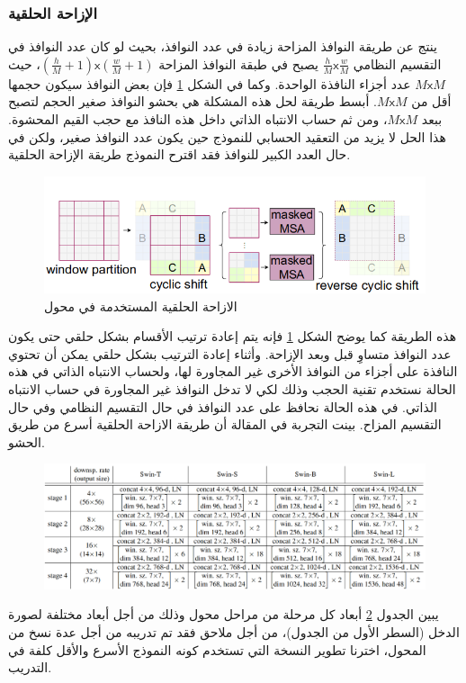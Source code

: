 \subsubsection{الإزاحة الحلقية
}
ينتج عن طريقة النوافذ المزاحة زيادة في عدد النوافذ، بحيث لو كان عدد النوافذ في التقسيم النظامي
$\frac{h}{M} \mathsf{x} \frac{w}{M}$
يصبح في طبقة النوافذ المزاحة
$(\frac{h}{M} +1) \mathsf{x} (\frac{w}{M}+1)$،
حيث
$M \mathsf{x} M$
عدد أجزاء النافذة الواحدة. وكما في الشكل 
\ref{fig:swin_shifted_cycled_window}
 فإن بعض النوافذ سيكون حجمها أقل من 
$M\mathsf{x}M$.
أبسط طريقة لحل هذه المشكلة هي بحشو 
النوافذ صغير الحجم لتصبح ببعد 
$M\mathsf{x}M$،
ومن ثم حساب الانتباه الذاتي داخل هذه النافذ  مع حجب القيم المحشوة.
هذا الحل لا يزيد من التعقيد الحسابي للنموذج حين يكون عدد النوافذ صغير، ولكن في حال العدد الكبير للنوافذ فقد اقترح النموذج طريقة الإزاحة الحلقية. 
\begin{figure}[!h]
	\centerline{\includegraphics[width=\textwidth]{images/swin_shifted_cycled_window.png}}
	\caption{
		الازاحة الحلقية المستخدمة في محول
		}
	\label{fig:swin_shifted_cycled_window}
\end{figure}
هذه الطريقة كما يوضح الشكل 
\ref{fig:swin_shifted_cycled_window}
 فإنه يتم إعادة ترتيب الأقسام بشكل حلقي حتى يكون عدد النوافذ متساوِ قبل وبعد الإزاحة. وأثناء إعادة الترتيب بشكل حلقي يمكن أن تحتوي النافذة على أجزاء من النوافذ الأخرى غير المجاورة لها،  ولحساب الانتباه الذاتي في هذه الحالة نستخدم تقنية الحجب 
 وذلك لكي لا تدخل النوافذ غير المجاورة في حساب الانتباه الذاتي.
في هذه الحالة نحافظ على عدد النوافذ في حال التقسيم النظامي وفي حال التقسيم المزاح.
بينت التجربة في المقالة
أن طريقة الازاحة الحلقية أسرع من طريق الحشو.
\begin{figure}[!h]
	\centerline{\includegraphics[width=\textwidth]{images/swin_architecture_table.png}}
	\caption{
	}
	\label{fig:swin_architecture_table}
\end{figure}
يبين الجدول 
\ref{fig:swin_architecture_table}
أبعاد كل مرحلة من مراحل محول 
وذلك من أجل أبعاد مختلفة لصورة الدخل (السطر الأول من الجدول)، من أجل ملاحق
فقد تم تدريبه من أجل عدة نسخ من المحول، اخترنا تطوير النسخة التي تستخدم
كونه النموذج الأسرع والأقل كلفة في التدريب.